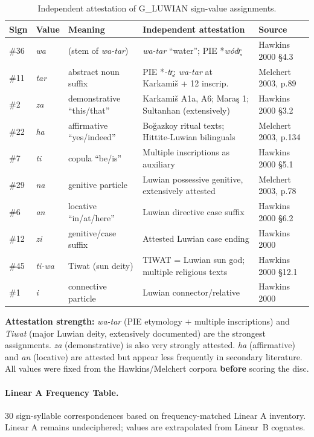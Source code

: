\documentclass[12pt,a4paper]{article}
\begin{document}
\begin{table}[h]
\centering
\small
\caption{Independent attestation of G\_LUWIAN sign-value assignments.}
\begin{tabular}{llp{3.2cm}p{4.5cm}l}
\toprule
Sign & Value & Meaning & Independent attestation & Source \\
\midrule
\#36 & \textit{wa} & (stem of \textit{wa-tar}) & \textit{wa-tar} ``water''; PIE *\textit{wódr̥} & Hawkins 2000 §4.3 \\
\#11 & \textit{tar} & abstract noun suffix & PIE *\textit{-tr̥}; \textit{wa-tar} at Karkamiš + 12 inscrip. & Melchert 2003, p.89 \\
\#2  & \textit{za} & demonstrative ``this/that'' & Karkamiš A1a, A6; Maraş 1; Sultanhan (extensively) & Hawkins 2000 §3.2 \\
\#22 & \textit{ha} & affirmative ``yes/indeed'' & Boğazkoy ritual texts; Hittite-Luwian bilinguals & Melchert 2003, p.134 \\
\#7  & \textit{ti} & copula ``be/is'' & Multiple inscriptions as auxiliary & Hawkins 2000 §5.1 \\
\#29 & \textit{na} & genitive particle & Luwian possessive genitive, extensively attested & Melchert 2003, p.78 \\
\#6  & \textit{an} & locative ``in/at/here'' & Luwian directive case suffix & Hawkins 2000 §6.2 \\
\#12 & \textit{zi} & genitive/case suffix & Attested Luwian case ending & Hawkins 2000 \\
\#45 & \textit{ti-wa} & Tiwat (sun deity) & TIWAT = Luwian sun god; multiple religious texts & Hawkins 2000 §12.1 \\
\#1  & \textit{i} & connective particle & Luwian connector/relative & Hawkins 2000 \\
\bottomrule
\end{tabular}
\end{table}

\noindent\textbf{Attestation strength:} \textit{wa-tar} (PIE etymology $+$ multiple inscriptions) and \textit{Tiwat} (major Luwian deity, extensively documented) are the strongest assignments. \textit{za} (demonstrative) is also very strongly attested. \textit{ha} (affirmative) and \textit{an} (locative) are attested but appear less frequently in secondary literature. All values were fixed from the Hawkins/Melchert corpora \textbf{before} scoring the disc.

\paragraph{Linear A Frequency Table.}
30 sign-syllable correspondences based on frequency-matched Linear A inventory. Linear A remains undeciphered; values are extrapolated from Linear~B cognates.
\end{document}
